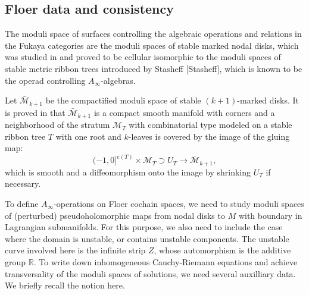 \documentclass{amsart}
\numberwithin{equation}{section}
\numberwithin{figure}{section}
\begin{document}
\subsection{Floer data and consistency}
	The moduli space of surfaces controlling the algebraic operations and relations in the Fukaya categories are the moduli spaces of stable marked nodal disks, which was studied in \cite{FOOO1} and proved to be cellular isomorphic to the moduli spaces of stable metric ribbon trees introduced by Stasheff [Stasheff], which is known to be the operad controlling $A_{\infty}$-algebras. \par
	Let $\bar{\mathcal{M}}_{k+1}$ be the compactified moduli space of stable $(k+1)$-marked disks. It is proved in \cite{FOOO1} that $\bar{\mathcal{M}}_{k+1}$ is a compact smooth manifold with corners and a neighborhood of the stratum $\mathcal{M}_{T}$ with combinatorial type modeled on a stable ribbon tree $T$ with one root and $k$-leaves is covered by the image of the gluing map:
\begin{equation} \label{tree gluing}
(-1, 0]^{e(T)} \times \mathcal{M}_{T} \supset U_{T} \to \bar{\mathcal{M}}_{k+1},
\end{equation}
which is smooth and a diffeomorphism onto the image by shrinking $U_{T}$ if necessary. \par

	To define $A_{\infty}$-operations on Floer cochain spaces, we need to study moduli spaces of (perturbed) pseudoholomorphic maps from nodal disks to $M$ with boundary in Lagrangian submanifolds. For this purpose, we also need to include the case where the domain is unstable, or contains unstable components. The unstable curve involved here is the infinite strip $Z$, whose automorphism is the additive group $\mathbb{R}$. To write down inhomogeneous Cauchy-Riemann equations and achieve transversality of the moduli spaces of solutions, we need several auxilliary data. We briefly recall the notion here. \par
\end{document}
